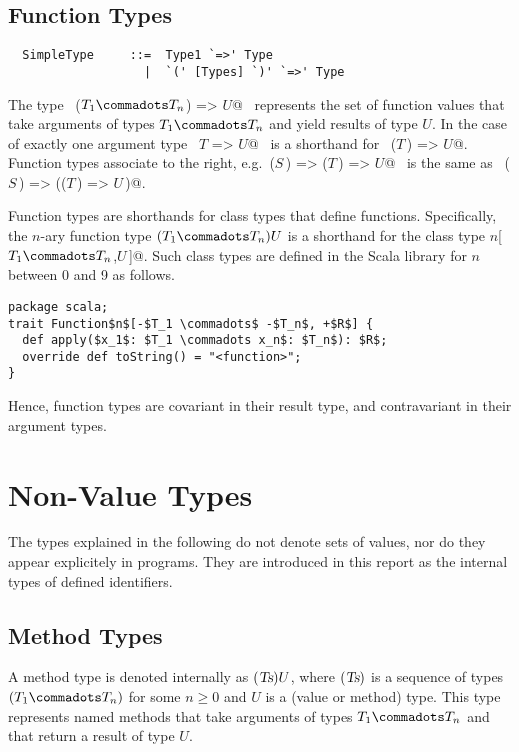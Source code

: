 \documentclass[a4paper,12pt,twoside,titlepage]{book}
\newcommand{\Ts}{\mbox{\sl Ts}}
\begin{document}
\subsection{Function Types}
\label{sec:function-types}

\syntax\begin{lstlisting}
  SimpleType     ::=  Type1 `=>' Type
                   |  `(' [Types] `)' `=>' Type
\end{lstlisting}
The type ~\lstinline@($T_1 \commadots T_n$) => $U$@~ represents the set of function
values that take arguments of types $T_1 \commadots T_n$ and yield
results of type $U$.  In the case of exactly one argument type
~\lstinline@$T$ => $U$@~ is a shorthand for ~\lstinline@($T\,$) => $U$@.  Function types
associate to the right, e.g.~\lstinline@($S\,$) => ($T\,$) => $U$@~ is the same as
~\lstinline@($S\,$) => (($T\,$) => $U\,$)@.

Function types are shorthands for class types that define 
functions.  Specifically, the $n$-ary function type $(T_1 \commadots
T_n)U$ is a shorthand for the class type
\lstinline@Function$n$[$T_1 \commadots T_n$,$U\,$]@. Such class
types are defined in the Scala library for $n$ between 0 and 9 as follows.
\begin{lstlisting}
package scala;
trait Function$n$[-$T_1 \commadots$ -$T_n$, +$R$] {
  def apply($x_1$: $T_1 \commadots x_n$: $T_n$): $R$;
  override def toString() = "<function>";
}
\end{lstlisting}
Hence, function types are covariant in their result type, and
contravariant in their argument types.

\section{Non-Value Types}
\label{sec:synthetic-types}

The types explained in the following do not denote sets of values, nor
do they appear explicitely in programs. They are introduced in this
report as the internal types of defined identifiers.

\subsection{Method Types}
\label{sec:method-types}

A method type is denoted internally as $(\Ts)U$, where $(\Ts)$ is a
sequence of types $(T_1 \commadots T_n)$ for some $n \geq 0$
and $U$ is a (value or method) type.  This type represents named
methods that take arguments of types $T_1 \commadots T_n$ 
and that return a result of type $U$.
\end{document}
